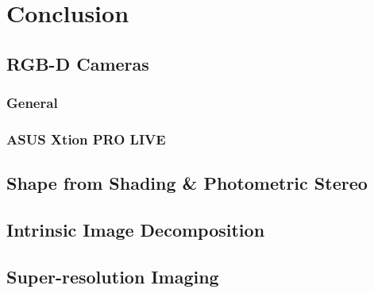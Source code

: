\chapter{Conclusion} \label{chap:conclusion}

\section{RGB-D Cameras}

\subsection{General}

\subsection{ASUS Xtion PRO LIVE}


\section{Shape from Shading \& Photometric Stereo}

\section{Intrinsic Image Decomposition}

\section{Super-resolution Imaging}

